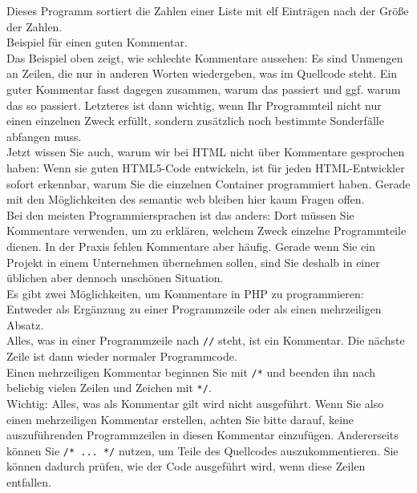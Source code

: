 Dieses Programm sortiert die Zahlen einer Liste mit elf Einträgen nach der Größe der Zahlen.\\

Beispiel für einen guten Kommentar.\\

Das Beispiel oben zeigt, wie schlechte Kommentare aussehen: Es sind Unmengen an Zeilen, die nur in anderen Worten wiedergeben, was im Quellcode steht. Ein guter Kommentar fasst dagegen zusammen, warum das passiert und ggf. warum das so passiert. Letzteres ist dann wichtig, wenn Ihr Programmteil nicht nur einen einzelnen Zweck erfüllt, sondern zusätzlich noch bestimmte Sonderfälle abfangen muss.\\

Jetzt wissen Sie auch, warum wir bei HTML nicht über Kommentare gesprochen haben: Wenn sie guten HTML5-Code entwickeln, ist für jeden HTML-Entwickler sofort erkennbar, warum Sie die einzelnen Container programmiert haben. Gerade mit den Möglichkeiten des semantic web bleiben hier kaum Fragen offen.\\

Bei den meisten Programmiersprachen ist das anders: Dort müssen Sie Kommentare verwenden, um zu erklären, welchem Zweck einzelne Programmteile dienen. In der Praxis fehlen Kommentare aber häufig. Gerade wenn Sie ein Projekt in einem Unternehmen übernehmen sollen, sind Sie deshalb in einer üblichen aber dennoch unschönen Situation.\\

Es gibt zwei Möglichkeiten, um Kommentare in PHP zu programmieren: Entweder als Ergänzung zu einer Programmzeile oder als einen mehrzeiligen Absatz.\\

Alles, was in einer Programmzeile nach \verb|//| steht, ist ein Kommentar. Die nächste Zeile ist dann wieder normaler Programmcode.\\

Einen mehrzeiligen Kommentar beginnen Sie mit \verb|/*| und beenden ihn nach beliebig vielen Zeilen und Zeichen mit \verb|*/|.\\

Wichtig: Alles, was als Kommentar gilt wird nicht ausgeführt. Wenn Sie also einen mehrzeiligen Kommentar erstellen, achten Sie bitte darauf, keine auszuführenden Programmzeilen in diesen Kommentar einzufügen. Andererseits können Sie \verb|/* ... */| nutzen, um Teile des Quellcodes auszukommentieren. Sie können dadurch prüfen, wie der Code ausgeführt wird, wenn diese Zeilen entfallen.

